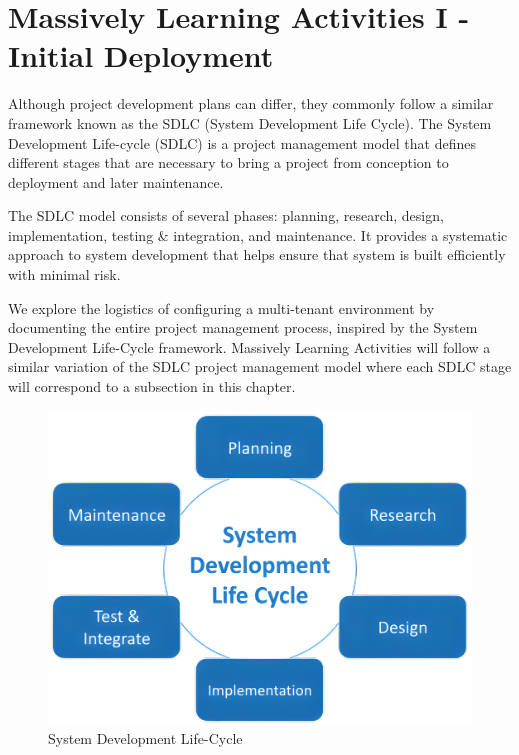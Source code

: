 \section{Massively Learning Activities I - Initial Deployment} \label{section: MLA}

Although project development plans can differ, they commonly follow a similar framework known as the SDLC (System Development Life Cycle). The System Development Life-cycle (SDLC) is a project management model that defines different stages that are necessary to bring a project from conception to deployment and later maintenance. 

The SDLC model consists of several phases: planning, research, design, implementation, testing \& integration, and maintenance. It provides a systematic approach to system development that helps ensure that system is built efficiently with minimal risk.

We explore the logistics of configuring a multi-tenant environment by documenting the entire project management process, inspired by the System Development Life-Cycle framework.  Massively Learning Activities will follow a similar variation of the SDLC project management model where each SDLC stage will correspond to a subsection in this chapter. 

\begin{figure}[H]
    \centering
    \includegraphics[scale = 0.175]{images/SDLC.png}
    \caption{System Development Life-Cycle}
    \label{SDLC}
\end{figure} 


